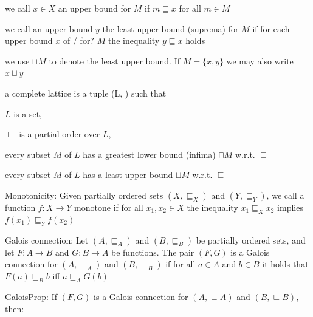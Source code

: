 \documentclass[landscape, a4paper]{article}
\begin{document}
\begin{minipage}[t]{0.2\linewidth}
\begin{betterlist}
\begin{betterlist}
\begin{betterlist}
			\end{betterlist}
			\item we call $x \in X$ an \alert{upper bound} for $M$ if $m \sqsubseteq x$ for all $m \in M$
			\item we call an upper bound $y$ the \alert{least upper bound} (suprema) for $M$ if for each upper bound $x$ of / for? $M$ the inequality $y \sqsubseteq x$ holds
			\begin{betterlist}
				\item we use $\sqcup M$ to denote the \alert{least upper bound}. If $M = \{x, y\}$ we may also write $x \sqcup y$
			\end{betterlist}
		\end{betterlist}
		\item a \alert{complete lattice} is a tuple (L, \sqsubseteq ) such that
		\begin{betterlist}
			\item $L$ is a set,
			\item $\sqsubseteq $ is a \alert{partial order} over $L$,
			\item every subset $M$ of $L$ has a \alert{greatest lower bound} (infima) $\sqcap M$ w.r.t. $\sqsubseteq$
			\item every subset $M$ of $L$ has a \alert{least upper bound} $\sqcup M$ w.r.t. $\sqsubseteq$
			\item {}
		\end{betterlist}
		\item \alert{Monotonicity:} Given partially ordered sets $(X, \sqsubseteq_X)$ and $(Y, \sqsubseteq_Y)$, we call a function $f:X\rightarrow Y$ \alert{monotone} if for all $x_1, x_2 \in X$ the inequality $x_1 \sqsubseteq_X x_2$ implies $f(x_1) \sqsubseteq_Y f(x_2)$
		\begin{betterlist}
			\item \script{385}{Examples}
		\end{betterlist}
		\item \color{orange}\alert{Galois connection:} Let $(A, \sqsubseteq_A)$ and $(B, \sqsubseteq_B)$ be partially ordered sets, and let $F : A \rightarrow B$ and $G : B \rightarrow A$ be functions. The pair $(F, G)$ is a Galois connection for $(A, \sqsubseteq_A)$ and $(B, \sqsubseteq_B)$ if for all $a \in A$ and $b \in B$ it holds that $F(a) \sqsubseteq_B b$ iff $a \sqsubseteq_A G(b)$\color{black}
		\item \color{orange}\alert{GaloisProp:} If $(F, G)$ is a \alert{Galois connection} for $(A, \sqsubseteq A)$ and $(B, \sqsubseteq B)$, then:

\end{betterlist}
\end{minipage}
\end{document}
